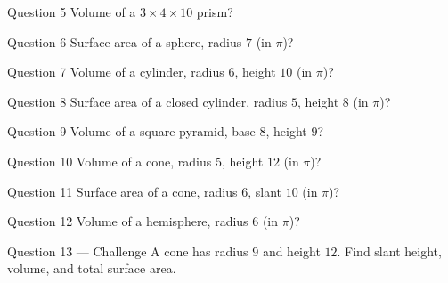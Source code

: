 \documentclass[11pt]{article}
\begin{document}
\begin{qbox}{Question 5}
Volume of a $3\times4\times10$ prism?\workspace{2.4cm}
\end{qbox}

\begin{qbox}{Question 6}
Surface area of a sphere, radius $7$ (in $\pi$)?\workspace{2.4cm}
\end{qbox}

\begin{qbox}{Question 7}
Volume of a cylinder, radius $6$, height $10$ (in $\pi$)?\workspace{2.4cm}
\end{qbox}

\begin{qbox}{Question 8}
Surface area of a closed cylinder, radius $5$, height $8$ (in $\pi$)?\workspace{2.4cm}
\end{qbox}

\begin{qbox}{Question 9}
Volume of a square pyramid, base $8$, height $9$?\workspace{2.4cm}
\end{qbox}

\begin{qbox}{Question 10}
Volume of a cone, radius $5$, height $12$ (in $\pi$)?\workspace{2.4cm}
\end{qbox}

\begin{qbox}{Question 11}
Surface area of a cone, radius $6$, slant $10$ (in $\pi$)?\workspace{2.4cm}
\end{qbox}

\begin{qbox}{Question 12}
Volume of a hemisphere, radius $6$ (in $\pi$)?\workspace{2.4cm}
\end{qbox}

\begin{qbox}{Question 13 --- Challenge}
A cone has radius $9$ and height $12$. Find slant height, volume, and total surface area.\workspace{3.4cm}
\end{qbox}

\clearpage
{}
\end{document}
